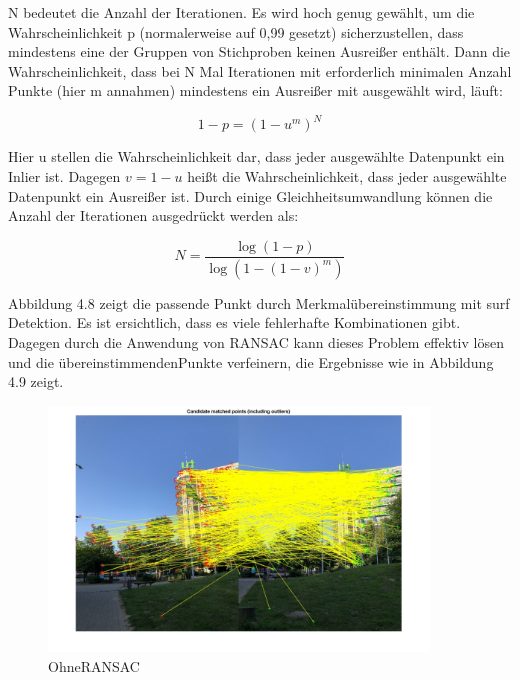 N bedeutet die Anzahl der Iterationen. Es wird hoch genug gewählt, um die Wahrscheinlichkeit p (normalerweise auf 0,99 gesetzt) sicherzustellen, dass mindestens eine der Gruppen von Stichproben keinen Ausreißer enthält.
Dann die Wahrscheinlichkeit, dass bei N Mal Iterationen mit erforderlich minimalen Anzahl Punkte (hier m annahmen) mindestens ein Ausreißer mit ausgewählt wird, läuft:

\begin{equation}
   1 - p = (1 - u^m)^N
\end{equation}

Hier u stellen die Wahrscheinlichkeit dar, dass jeder ausgewählte Datenpunkt ein Inlier ist. Dagegen $v = 1 - u$ heißt die Wahrscheinlichkeit, dass jeder ausgewählte Datenpunkt ein Ausreißer ist. Durch einige Gleichheitsumwandlung können die Anzahl der Iterationen ausgedrückt werden als:

\begin{equation}
   N = \frac{\log(1 - p)}{\log(1 - (1 - v)^m)}
\end{equation}

Abbildung 4.8 zeigt die passende Punkt durch Merkmalübereinstimmung mit \gls{surf} Detektion. Es ist ersichtlich, dass es viele fehlerhafte Kombinationen gibt. Dagegen durch die Anwendung von RANSAC kann dieses Problem effektiv lösen und die übereinstimmendenPunkte verfeinern, die Ergebnisse wie in Abbildung 4.9 zeigt.

\begin{figure}[H]
 \centering 
 \includegraphics[keepaspectratio,width=0.9\textwidth]{images/4_ZweiteErfahrung/RANSAC/OhneRANSAC.pdf}
 \caption{OhneRANSAC}
 \label{fig:OhneRANSAC}
\end{figure} 

